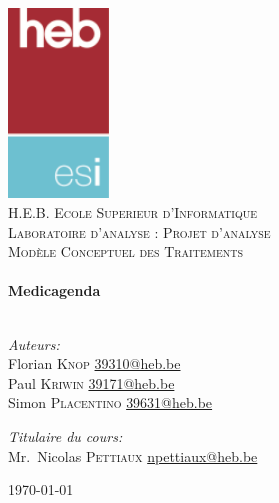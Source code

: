 \begin{titlepage}
	\begin{center}

		\includegraphics[keepaspectratio=true,width=0.20\textwidth]{../ressources/logo}\\[1cm]

		\textsc{\LARGE H.E.B. Ecole Superieur d'Informatique}\\[1.5cm]

		\textsc{\Large Laboratoire d'analyse : Projet d'analyse}\\[0.5cm]
		\textsc{\Large Modèle Conceptuel des Traitements}\\[0.5cm]

		\HRule \\[0.4cm]
		{\huge \bfseries Medicagenda \\[0.4cm]}
		\HRule \\[1.5cm]

		\noindent
		\begin{minipage}[t]{0.4\textwidth}
			\begin{flushleft} \large
				\emph{Auteurs:}\\
				Florian \textsc{Knop} \href{mailto:39310@heb.be}{39310@heb.be}\\
				Paul \textsc{Kriwin} \href{mailto:39171@heb.be}{39171@heb.be}\\
				Simon \textsc{Placentino} \href{mailto:39631@heb.be}{39631@heb.be}\
			\end{flushleft}
		\end{minipage}%
		\begin{minipage}[t]{0.4\textwidth}
			\begin{flushright} \large
				\emph{Titulaire du cours:} \\
				Mr.~Nicolas \textsc{Pettiaux}
				\href{mailto:npettiaux@heb.be}{npettiaux@heb.be}
			\end{flushright}
		\end{minipage}

		\vfill

		{\large \today}

	\end{center}
	\clearpage\null\newpage
\end{titlepage}
